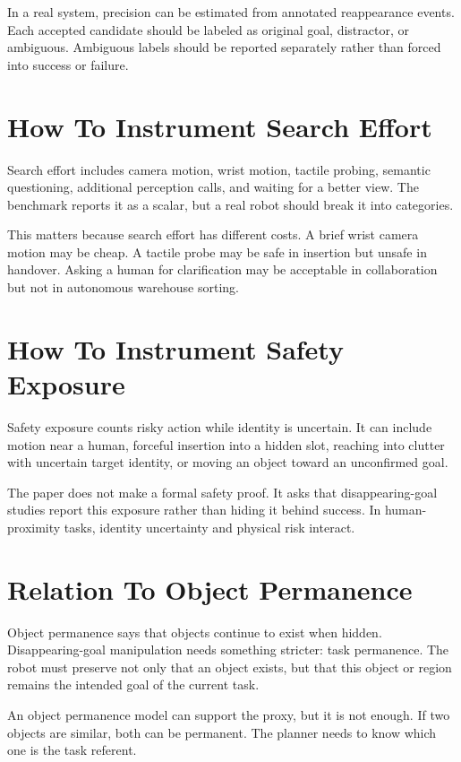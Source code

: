 In a real system, precision can be estimated from annotated reappearance events. Each accepted candidate should be labeled as original goal, distractor, or ambiguous. Ambiguous labels should be reported separately rather than forced into success or failure.

\section{How To Instrument Search Effort}

Search effort includes camera motion, wrist motion, tactile probing, semantic questioning, additional perception calls, and waiting for a better view. The benchmark reports it as a scalar, but a real robot should break it into categories.

This matters because search effort has different costs. A brief wrist camera motion may be cheap. A tactile probe may be safe in insertion but unsafe in handover. Asking a human for clarification may be acceptable in collaboration but not in autonomous warehouse sorting.

\section{How To Instrument Safety Exposure}

Safety exposure counts risky action while identity is uncertain. It can include motion near a human, forceful insertion into a hidden slot, reaching into clutter with uncertain target identity, or moving an object toward an unconfirmed goal.

The paper does not make a formal safety proof. It asks that disappearing-goal studies report this exposure rather than hiding it behind success. In human-proximity tasks, identity uncertainty and physical risk interact.

\section{Relation To Object Permanence}

Object permanence says that objects continue to exist when hidden. Disappearing-goal manipulation needs something stricter: task permanence. The robot must preserve not only that an object exists, but that this object or region remains the intended goal of the current task.

An object permanence model can support the proxy, but it is not enough. If two objects are similar, both can be permanent. The planner needs to know which one is the task referent.

